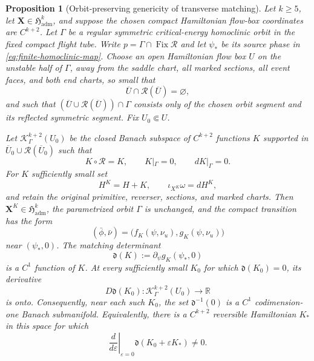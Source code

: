 \documentclass[11pt]{amsart}
\numberwithin{equation}{section}
\newtheorem{proposition}[theorem]{Proposition}
\theoremstyle{definition}
\theoremstyle{remark}
\newcommand{\Fix}{\operatorname {Fix}}
\begin{document}
\begin{proposition}[Orbit-preserving genericity of transverse matching]
\label{prop:matching-transversality}
Let $k\ge5$, let $\mathbf X\in\mathfrak H_{\mathrm{adm}}^k$, and suppose
the chosen compact Hamiltonian flow-box coordinates are $C^{k+2}$.
Let $\Gamma$ be a regular symmetric critical-energy homoclinic orbit in
the fixed compact flight tube.  Write
$p=\Gamma\cap\Fix\mathcal R$ and let $\psi_*$ be its source phase in
\eqref{eq:finite-homoclinic-map}.  Choose an open Hamiltonian flow box
$U$ on the unstable half of $\Gamma$, away from the saddle chart, all
marked sections, all event faces, and both end charts, so small that
\[
 \overline U\cap\mathcal R(\overline U)=\varnothing,
\]
and such that $(\overline U\cup\mathcal R(\overline U))\cap\Gamma$
consists only of the chosen orbit segment and its reflected symmetric
segment.  Fix $U_0\Subset U$.

Let $\mathcal K_\Gamma^{k+2}(U_0)$ be the closed Banach subspace of
$C^{k+2}$ functions $K$ supported in
$\overline U_0\cup\mathcal R(\overline U_0)$ such that
\begin{equation}\label{eq:orbit-preserving-hamiltonian-space}
 K\circ\mathcal R=K,\qquad K|_\Gamma=0,\qquad dK|_\Gamma=0.
\end{equation}
For $K$ sufficiently small set
\[
 H^K=H+K,\qquad \iota_{X^K}\omega=dH^K,
\]
and retain the original primitive, reverser, sections, and marked charts.
Then $\mathbf X^K\in\mathfrak H_{\mathrm{adm}}^k$, the parametrized orbit
$\Gamma$ is unchanged, and the compact transition has the form
\[
 (\bar\phi,\bar\nu)
   =\bigl(f_K(\psi,\nu_u),g_K(\psi,\nu_u)\bigr)
\]
near $(\psi_*,0)$.  The matching determinant
\begin{equation}\label{eq:matching-determinant-evaluation}
 \mathfrak d(K):=\partial_\psi g_K(\psi_*,0)
\end{equation}
is a $C^1$ function of $K$.  At every sufficiently small $K_0$ for which
$\mathfrak d(K_0)=0$, its derivative
\[
 D\mathfrak d(K_0):
 \mathcal K_\Gamma^{k+2}(U_0)\longrightarrow\mathbb R
\]
is onto.  Consequently, near each such $K_0$, the set
$\mathfrak d^{-1}(0)$ is a $C^1$ codimension-one Banach submanifold.
Equivalently, there is a $C^{k+2}$ reversible Hamiltonian $K_*$ in this
space for which
\begin{equation}\label{eq:matching-determinant-crossing}
 \left.\frac d{d\varepsilon}\right|_{\varepsilon=0}
 \mathfrak d(K_0+\varepsilon K_*)\ne0.
\end{equation}


\end{proposition}
\end{document}
